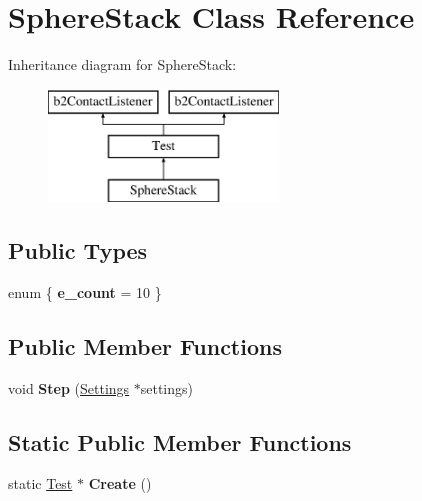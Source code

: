 \hypertarget{class_sphere_stack}{\section{Sphere\-Stack Class Reference}
\label{class_sphere_stack}
}
Inheritance diagram for Sphere\-Stack\-:\begin{figure}[H]
\begin{center}
\leavevmode
\includegraphics[height=3.000000cm]{class_sphere_stack}
\end{center}
\end{figure}
\subsection*{Public Types}
\begin{DoxyCompactItemize}
\item 
enum \{ {\bfseries e\-\_\-count} =  10
 \}
\end{DoxyCompactItemize}
\subsection*{Public Member Functions}
\begin{DoxyCompactItemize}
\item 
\hypertarget{class_sphere_stack_a688554212584d8358d9c817cdf47de34}{void {\bfseries Step} (\hyperlink{struct_settings}{Settings} $\ast$settings)}\label{class_sphere_stack_a688554212584d8358d9c817cdf47de34}

\end{DoxyCompactItemize}
\subsection*{Static Public Member Functions}
\begin{DoxyCompactItemize}
\item 
\hypertarget{class_sphere_stack_a5d609f722b54b0436567805261e9cdfb}{static \hyperlink{class_test}{Test} $\ast$ {\bfseries Create} ()}\label{class_sphere_stack_a5d609f722b54b0436567805261e9cdfb}

\end{DoxyCompactItemize}
